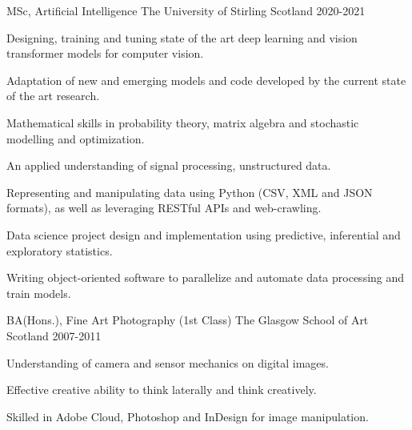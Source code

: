 

\begin{cventries}

  \cventry
    {MSc, Artificial Intelligence} %
    {\newline The University of Stirling} %
    {Scotland} %
    {2020-2021} %
    {
      \begin{cvitems} %
        \item {Designing, training and tuning state of the art deep learning and vision transformer models for computer vision.}
        \item{Adaptation of new and emerging models and code developed by the current state of the art research.}
        \item{Mathematical skills in probability theory, matrix algebra and stochastic modelling and optimization.}
        \item{An applied understanding of signal processing, unstructured data.}
        \item{Representing and manipulating data using Python (CSV, XML and JSON formats), as well as leveraging RESTful APIs and web-crawling.}
        \item{Data science project design and implementation using predictive, inferential and exploratory statistics.}
        \item{Writing object-oriented software to parallelize and automate data processing and train models.}
      \end{cvitems}
    }
\cventry
    {BA(Hons.), Fine Art Photography (1st Class) } %
    {\newline The Glasgow School of Art } %
    {Scotland} %
    {2007-2011} %
    {
      \begin{cvitems} %
        \item {Understanding of camera and sensor mechanics on digital images.}
        \item{Effective creative ability to think laterally and think creatively.}
        \item{Skilled in Adobe Cloud, Photoshop and InDesign for image manipulation.}

\end{cvitems}}
\end{cventries}
